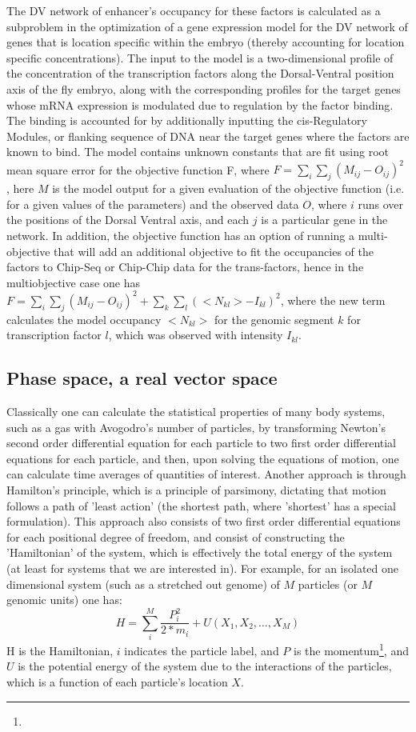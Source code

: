 The DV network of enhancer's occupancy for these factors is calculated as a subproblem in the optimization of a gene expression model for the DV network of genes that is location specific within the embryo (thereby accounting for location specific concentrations).  The input to the model is a two-dimensional profile of the concentration of the transcription factors along the Dorsal-Ventral position axis of the fly embryo, along with the corresponding profiles for the target genes whose mRNA expression is modulated due to regulation by the factor binding.  The binding is accounted for by additionally inputting the cis-Regulatory Modules, or flanking sequence of DNA near the target genes where the factors are known to bind.  The model contains unknown constants that are fit using root mean square error for the objective function F, where  $F=\sum_i \sum_j (M_{ij}-O_{ij})^2$ , here $M$ is the model output for a given evaluation of the objective function (i.e. for a given values of the parameters) and the observed data $O$, where $i$ runs over the positions of the Dorsal Ventral axis, and each $j$ is a particular gene in the network.   In addition, the objective function has an option of running a multi-objective that will add an additional objective to fit the occupancies of the factors to Chip-Seq or Chip-Chip data for the trans-factors, hence in the multiobjective case one has $F=\sum_i \sum_j(M_{ij}-O_{ij})^2 + \sum_k \sum_l (<N_{kl}>-I_{kl} )^2$, where the new term calculates the model occupancy $<N_{kl}>$ for the genomic segment $k$ for transcription factor $l$, which was observed with intensity $I_{kl}$.  

\subsection{Phase space, a real vector space }
Classically one can calculate the statistical properties of many body systems, such as a gas with Avogodro's number of particles, by transforming Newton's second order differential equation for each particle to two first order differential equations for each particle, and then, upon solving the equations of motion, one can calculate time averages of quantities of interest.  Another approach is through Hamilton's principle, which is a principle of parsimony, dictating that motion follows a path of 'least action' (the shortest path, where 'shortest' has a special formulation).  This approach also consists of two first order differential equations for each positional degree of freedom, and consist of constructing the 'Hamiltonian' of the system, which is effectively the total energy of the system (at least for systems that we are interested in).  For example, for an isolated one dimensional system (such as a stretched out genome) of $M$ particles (or $M$ genomic units) one has:
  \begin{equation}\label{hamiltonian}
    H= \sum_i^M \frac{P_i^2}{2*m_i} + U(X_1, X_2,\dotsc ,X_M)
  \end{equation}
  H is the Hamiltonian, $i$ indicates the particle label, and $P$ is the momentum\footnote{}, and $U$ is the potential energy of the system due to the interactions of the particles, which is a function of each particle's location $X$.  
  
